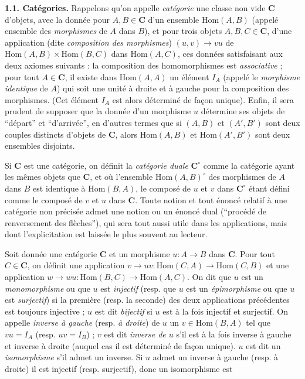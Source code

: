 \noindent\textbf{1.1. Catégories.}\quad
{}
Rappelons qu'on appelle \textit{catégorie} une classe non vide $\mathbf{C}$ d'objets,
avec la donnée pour $A,B\in\mathbf{C}$ d'un ensemble $\mathrm{Hom}(A,B)$ (appelé
ensemble des \textit{morphismes} de $A$ dans $B$), et pour trois objets
$A,B,C\in\mathbf{C}$, d'une application (dite \textit{composition des morphismes})
$(u,v)\to vu$ de $\mathrm{Hom}(A,B)\times\mathrm{Hom}(B,C)$ dans
$\mathrm{Hom}(A,C)$, ces données satisfaisant aux deux axiomes suivants : la
composition des homomorphismes est \textit{associative} ; pour tout $A\in\mathbf{C}$,
il existe dans $\mathrm{Hom}(A,A)$ un élément $I_A$ (appelé le
\textit{morphisme identique} de $A$) qui soit une unité à droite et à gauche
pour la composition des morphismes. (Cet élément $I_A$ est alors déterminé de
façon unique). Enfin, il sera prudent de supposer que la donnée d'un morphisme
$u$ détermine ses objets de ``départ'' et ``d'arrivée'', en d'autres termes que
si $(A,B)$ et $(A',B')$ sont deux couples distincts d'objets de $\mathbf{C}$, alors
$\mathrm{Hom}(A,B)$ et $\mathrm{Hom}(A',B')$ sont deux ensembles disjoints.

Si $\mathbf{C}$ est une catégorie, on définit la \textit{catégorie duale} $\mathbf{C}^{\circ}$
comme la catégorie ayant les mêmes objets que $\mathbf{C}$, et où l'ensemble
$\mathrm{Hom}(A,B)^{\circ}$ des morphismes de $A$ dans $B$ est identique à
$\mathrm{Hom}(B,A)$, le composé de $u$ et $v$ dans $\mathbf{C}^{\circ}$ étant défini
comme le composé de $v$ et $u$ dans $\mathbf{C}$. Toute notion et tout énoncé relatif à
une catégorie non précisée admet une notion ou un énoncé dual
(``procédé de renversement des flèches''), qui sera tout aussi utile dans les
applications, mais dont l'explicitation est laissée le plus souvent au
lecteur.

Soit donnée une catégorie $\mathbf{C}$ et un morphisme $u:A\to B$ dans $\mathbf{C}$.
Pour tout $C\in\mathbf{C}$, on définit une application
$v\to uv:\mathrm{Hom}(C,A)\to\mathrm{Hom}(C,B)$ et
une application
$w\to wu:\mathrm{Hom}(B,C)\to\mathrm{Hom}(A,C)$.
On dit que $u$ est un \textit{monomorphisme} ou que $u$ est
\textit{injectif} (resp. que $u$ est un \textit{épimorphisme} ou que $u$ est
\textit{surjectif}) si la première (resp. la seconde) des deux applications
précédentes est toujours injective ; $u$ est dit \textit{bijectif} si $u$ est
à la fois injectif et surjectif.
On appelle \textit{inverse à gauche} (resp. \textit{à droite}) de $u$ un
$v\in\mathrm{Hom}(B,A)$ tel que $vu=I_A$ (resp. $uv=I_B$) ; $v$ est dit
\textit{inverse de $u$} s'il est à la fois inverse à gauche et inverse à
droite (auquel cas il est déterminé de façon unique). $u$ est dit un
\textit{isomorphisme} s'il admet un inverse. Si $u$ admet un inverse à gauche
(resp. à droite) il est injectif (resp. surjectif), donc un isomorphisme est

